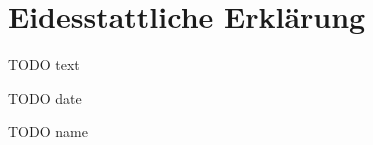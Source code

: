 \section{Eidesstattliche Erklärung}
TODO text

\bigskip
\bigskip
\bigskip
\bigskip
	
\begin{multicols}{2}
  \raggedright
  TODO date
  
  \raggedleft
  TODO name
\end{multicols}
